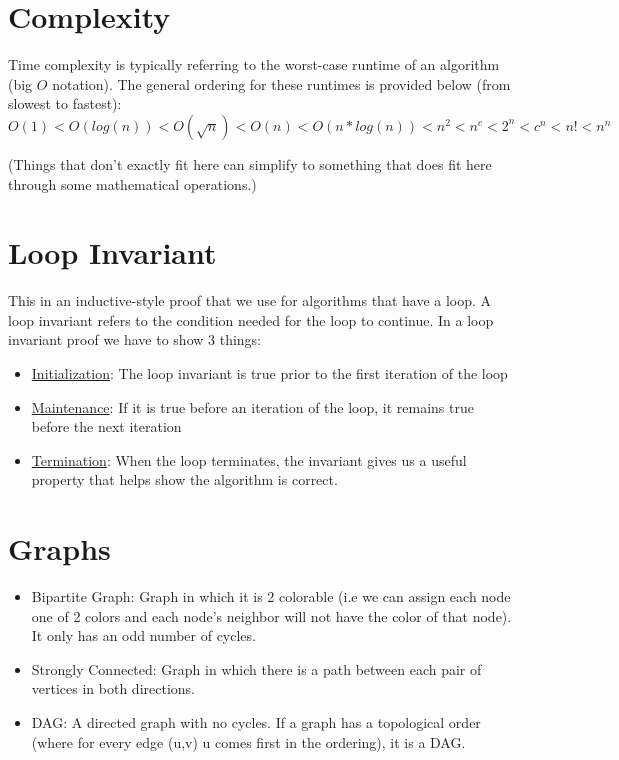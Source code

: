 \documentclass{article}
\begin{document}
\section{Complexity}
Time complexity is typically referring to the worst-case runtime of an algorithm (big $O$ notation). The general ordering for these runtimes is provided below (from slowest to fastest):
$O(1) < O(log(n)) < O(\sqrt{n}) < O(n) < O(n*log(n)) < n^2 < n^c < 2^n < c^n < n! < n^n$

(Things that don't exactly fit here can simplify to something that does fit here through some mathematical operations.)

\section{Loop Invariant}
This in an inductive-style proof that we use for algorithms that have a loop. A loop invariant refers to the condition needed for the loop to continue. In a loop invariant proof we have to show 3 things:
\begin{itemize}
    \item \underline{Initialization}: The loop invariant is true prior to the first iteration of the loop
    \item \underline{Maintenance}: If it is true before an iteration of the loop, it remains true before the next iteration
    \item \underline{Termination}: When the loop terminates, the invariant gives us a useful property that helps show the algorithm is correct.
\end{itemize}

\section{Graphs}
\begin{itemize}
    \item Bipartite Graph: Graph in which it is 2 colorable (i.e we can 
      assign each node one of 2 colors and each node's neighbor will not 
      have the color of that node). It only has an odd number of cycles.
    \item Strongly Connected: Graph in which there is a path between each 
      pair of vertices in both directions.
    \item DAG: A directed graph with no cycles. If a graph has a topological order (where for every
      edge (u,v) u comes first in the ordering), it is a DAG.
\end{itemize}
\end{document}
